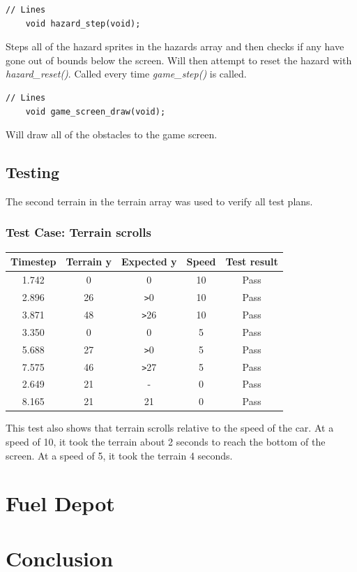 \documentclass{article}
\begin{document}
\begin{lstlisting}[style=CStyle]
	// Lines
	void hazard_step(void);
\end{lstlisting}
Steps all of the hazard sprites in the hazards array and then checks if any have gone out of bounds below the screen. Will then attempt to reset the hazard with \emph{hazard\_reset()}. Called every time \emph{game\_step()} is called.
\begin{lstlisting}[style=CStyle]
	// Lines 
	void game_screen_draw(void);
\end{lstlisting}
Will draw all of the obstacles to the game screen.
\newpage

\subsection*{Testing}
The second terrain in the terrain array was used to verify all test plans.

\subsubsection*{Test Case: Terrain scrolls}
\begin{center}
\begin{tabular}{ c c c c c }
Timestep	& Terrain y	& Expected y 	& Speed	& Test result		\\ \hline
1.742		& 0		& 0 			& 10		& Pass		\\
2.896		& 26		& \verb|>|0		& 10		& Pass		\\
3.871		& 48		& \verb|>|26	& 10		& Pass		\\
3.350		& 0		& 0			& 5		& Pass		\\
5.688		& 27		& \verb|>|0		& 5		& Pass		\\
7.575		& 46		& \verb|>|27	& 5		& Pass		\\
2.649		& 21		& - 			& 0		& Pass		\\
8.165		& 21		& 21			& 0		& Pass		\\
\end{tabular}
\end{center}
This test also shows that terrain scrolls relative to the speed of the car. At a speed of 10, it took the terrain about 2 seconds to reach the bottom of the screen. At a speed of 5, it took the terrain 4 seconds.
\clearpage

\section{Fuel Depot}


\clearpage

\section{Conclusion}
\end{document}
